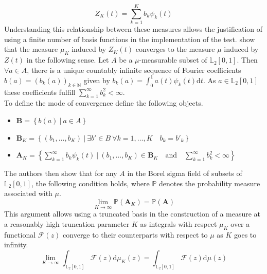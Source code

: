 \documentclass[12pt, a4paper]{article}
\theoremstyle{MAstyle} \newtheorem{assumption}{Assumption}[section]
\theoremstyle{MAstyle} \newtheorem{definition}{Definition}[section]
\theoremstyle{MAstyle} \newtheorem{theorem}{Theorem}[section]
\begin{document}
			\begin{equation}\label{finite_sum}
				Z_K(t) = \sum_{k = 1}^{K} b_k \psi_k(t)
			\end{equation}
			Understanding this relationship between these measures allows the justification of using a finite number of basis functions in the implementation of the test.
			\cite{bugni_goodness--fit_2009} show that the measure $\mu_K$ induced by $Z_K(t)$ converges to the measure $\mu$ induced by $Z(t)$ in the following sense. Let $A$ be a $\mu$-measurable subset of $\mathbb{L}_2[0,1]$. Then $\forall a \in A$, there is a unique countably infinite sequence of Fourier coefficients $b(a) = (b_k(a))_{k \in \mathbb{N}}$ given by $b_k(a) = \int_{0}^{1} a(t) \psi_k(t) \mathrm{d}t$. As $a \in \mathbb{L}_2[0,1]$ these coefficients fulfill $\sum_{k = 1}^{\infty} b_k^2 < \infty$. \\
			
			To define the mode of convergence \cite{bugni_goodness--fit_2009} define the following objects.
			\begin{itemize}
				\item $\textbf{B} = \left\{b(a) \ \vert \ a \in A\right\}$
				\item $\textbf{B}_K = \left\{\left(b_1, \dots, b_K \right) \ \vert \ \exists b' \in B \  \forall k = 1, \dots, K \quad b_k = b'_k \right\}$
				\item $\textbf{A}_K = \left\{ \sum_{k = 1}^{\infty} b_k \psi_k(t) \ \vert \ \left(b_1, \dots, b_K \right) \in \textbf{B}_K \quad \text{and} \quad \sum_{k = 1}^{\infty} b_k^2 < \infty \right\}$
			\end{itemize}
			The authors then show that for any $A$ in the Borel sigma field of subsets of $\mathbb{L}_2[0,1]$, the following condition holds, where $\mathbb{P}$ denotes the probability measure associated with $\mu$.
			\begin{equation}
				\lim_{K \rightarrow \infty} \mathbb{P}(\textbf{A}_K) = \mathbb{P}(\textbf{A})
			\end{equation}
			This argument allows using a truncated basis in the construction of a measure at a reasonably high truncation parameter $K$ as integrals with respect $\mu_K$ over a functional $\mathcal{F}(z)$ converge to their counterparts with respect to $\mu$ as $K$ goes to infinity.
			\begin{equation}
				\lim_{K \rightarrow \infty} \int_{\mathbb{L}_2[0,1]} \mathcal{F}(z) \mathrm{d}\mu_K(z) = \int_{\mathbb{L}_2[0,1]} \mathcal{F}(z) \mathrm{d}\mu(z)
			\end{equation}
			
\end{document}
